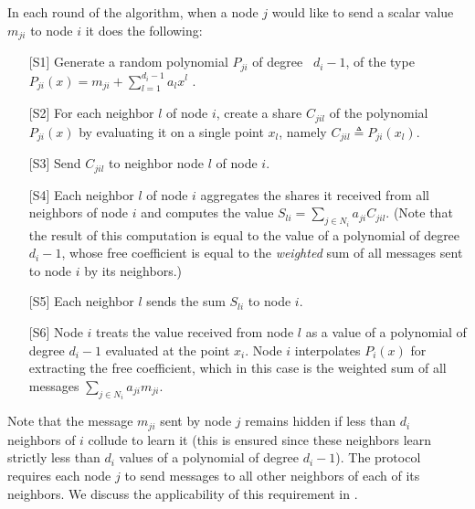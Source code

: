 \documentclass[10pt]{svjour3}
\begin{document}
In each round of the algorithm, when a node $j$ would like to send
a scalar value $m_{ji}$ to node $i$ it does the following:
\begin{itemize}
    \item [{[S1]}]  Generate a random polynomial $P_{ji}$ of degree
   ~$d_i-1$, of the type $P_{ji}(x) = m_{ji} + \sum_{l=1}^{d_i-1} a_l
    x^l$\/ .
    \item [{[S2]}] For each neighbor $l$ of node $i$, create a share $C_{jil}$ of
    the polynomial $P_{ji}(x)$ by evaluating it on a single point
    $x_{l}$, namely $C_{jil} \triangleq P_{ji}(x_l)$.
\item [{[S3]}] Send $C_{jil}$ to neighbor node $l$ of node $i$.
    \item [{[S4]}] Each neighbor $l$ of node $i$ aggregates the
      shares it received from all neighbors of node $i$  and computes the value
 $S_{li} = \sum_{j \in N_i} a_{ji} C_{jil}$. (Note
 that the result of this computation is equal to the value of a polynomial of degree $d_i-1$,
 whose free coefficient is equal to the {\em weighted} sum of all messages sent to
 node $i$ by its neighbors.)
    \item [{[S5]}] Each neighbor $l$ sends the sum $S_{li}$ to node $i$.

    \item [{[S6]}]
    Node $i$ treats the value received from node $l$ as a
      value of a polynomial of degree $d_i-1$ evaluated at the point
      $x_i$. Node $i$ interpolates $P_i(x)$ for extracting the
    free coefficient, which in this case is the weighted sum of all
    messages $\sum_{j \in N_i} a_{ji} m_{ji}$.
\end{itemize}




Note that the message $m_{ji}$ sent by node $j$ remains hidden
if less than  $d_i$ neighbors of $i$ collude to learn
it (this is ensured since these neighbors learn strictly less than $d_i$ values
of a polynomial of degree $d_i-1$).
The protocol requires each node $j$ to send messages to
all other
neighbors of each of its neighbors. We discuss the applicability of this requirement in
.
\end{document}
